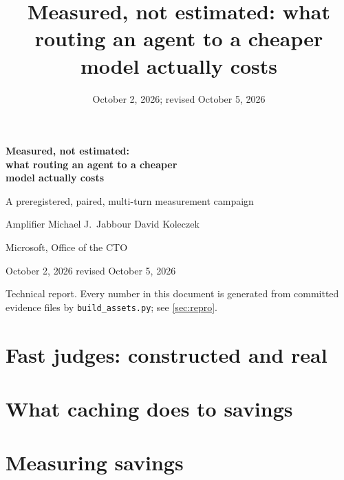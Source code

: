 \documentclass[11pt,letterpaper]{article}
\title{Measured, not estimated: what routing an agent to a cheaper model actually costs}
\date{October 2, 2026; revised October 5, 2026}
\newcommand{\code}[1]{\texttt{#1}}
\begin{document}
\begin{titlepage}
  \centering
  \vspace*{0.9in}
  {\LARGE\bfseries Measured, not estimated:\\[4pt] what routing an agent to a cheaper\\[4pt] model actually costs\par}
  \vspace{10pt}
  {\Large A preregistered, paired, multi-turn measurement campaign\par}
  \vspace{30pt}
  {\large Amplifier \qquad Michael J.\ Jabbour \qquad David Koleczek\par}
  \vspace{6pt}
  {\normalsize Microsoft, Office of the CTO\par}
  \vspace{14pt}
  {\normalsize October 2, 2026 \textperiodcentered{} revised October 5, 2026\par}
  \vspace{30pt}
  \begin{minipage}{0.88\textwidth}
    
  \end{minipage}
  \vfill
  {\small Technical report. Every number in this document is generated from committed evidence files by
  \code{build\_assets.py}; see \cref{sec:repro}.\par}
\end{titlepage}

\setcounter{tocdepth}{1}
\tableofcontents
\clearpage



\part{Fast judges: constructed and real}\label{part:judges}




\part{What caching does to savings}\label{part:caching}




\part{Measuring savings}\label{part:measuring}






\end{document}
